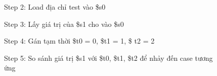 \documentclass[a4paper,12pt]{article}
\begin{document}
\begin{figure}[!h]
	\centerline{}
	\caption*{Step 2: Load địa chỉ test vào \$s0}
	\label{fig:3s2}
\end{figure}
\begin{figure}[!h]
	\centerline{}
	\caption*{Step 3: Lấy giá trị của \$s1 cho vào \$s0}
	\label{fig:3s3}
\end{figure}
\begin{figure}[!h]
	\centerline{}
	\caption*{Step 4: Gán tạm thời \$t0 = 0, \$t1 = 1, \$ t2 = 2}
	\label{fig:3s4}
\end{figure}
\begin{figure}[!h]
	\centerline{}
	\caption*{Step 5: So sánh giá trị \$s1 với \$t0, \$t1, \$t2 để nhảy đến case tương ứng}
	\label{fig:3s5}
\end{figure}
\end{document}
